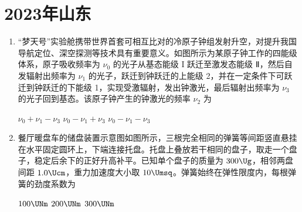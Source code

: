 \documentclass[\gkver]{gaokaozhenti}
\begin{document}
\chapter{2023年山东}

\begin{enumerate}
\item
“梦天号”实验舱携带世界首套可相互比对的冷原子钟组发射升空，对提升我国导航定位、深空探测等技术具有重要意义。如图所示为某原子钟工作的四能级体系，原子吸收频率为 $\nu_{0}$ 的光子从基态能级 I 跃迁至激发态能级 Ⅱ，然后自发辐射出频率为 $\nu_{1}$ 的光子，跃迁到钟跃迁的上能级 2，并在一定条件下可跃迁到钟跃迁的下能级 1，实现受激辐射，发出钟激光，最后辐射出频率为 $\nu_{3}$ 的光子回到基态。该原子钟产生的钟激光的频率 $\nu_{2}$ 为


{$\nu_{0} + \nu_{1} - \nu_{3}$}
{$\nu_{0} - \nu_{1} + \nu_{3}$}
{$\nu_{0} - \nu_{1} - \nu_{3}$}


\item
餐厅暖盘车的储盘装置示意图如图所示，三根完全相同的弹簧等间距竖直悬挂在水平固定圆环上，下端连接托盘。托盘上叠放若干相同的盘子，取走一个盘子，稳定后余下的正好升高补平。已知单个盘子的质量为 $300 \Ug$，相邻两盘间距 $1.0 \Ucm$，重力加速度大小取 $10 \Umsq$。弹簧始终在弹性限度内，每根弹簧的劲度系数为


\fourchoices[answer=B]
{$10 \UNm$}
{$100 \UNm$}
{$200 \UNm$}
{$300 \UNm$}

\end{enumerate}
\end{document}
